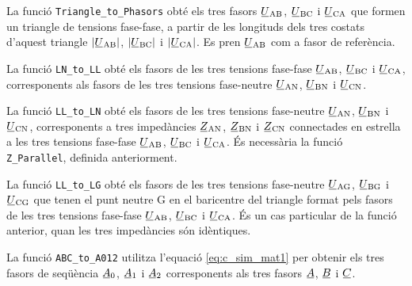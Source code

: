 La funció \texttt{Triangle\_to\_Phasors} obté els tres fasors $\cmplx{U}\ped{AB}$, $\cmplx{U}\ped{BC}$ i $\cmplx{U}\ped{CA}$ que formen un triangle de tensions fase-fase, a partir de les longituds dels tres costats d'aquest triangle $|\cmplx{U}\ped{AB}|$, $|\cmplx{U}\ped{BC}|$ i $|\cmplx{U}\ped{CA}|$. Es pren $\cmplx{U}\ped{AB}$ com a fasor de referència.




La funció \texttt{LN\_to\_LL} obté els fasors de les tres tensions fase-fase $\cmplx{U}\ped{AB}$, $\cmplx{U}\ped{BC}$ i $\cmplx{U}\ped{CA}$, corresponents als fasors de les tres tensions fase-neutre
$\cmplx{U}\ped{AN}$, $\cmplx{U}\ped{BN}$ i $\cmplx{U}\ped{CN}$.




La funció \texttt{LL\_to\_LN} obté els fasors de les tres tensions fase-neutre $\cmplx{U}\ped{AN}$, $\cmplx{U}\ped{BN}$ i $\cmplx{U}\ped{CN}$, corresponents a tres impedàncies $\cmplx{Z}\ped{AN}$, $\cmplx{Z}\ped{BN}$ i $\cmplx{Z}\ped{CN}$ connectades en estrella a  les tres tensions fase-fase
$\cmplx{U}\ped{AB}$, $\cmplx{U}\ped{BC}$ i $\cmplx{U}\ped{CA}$. És necessària la funció \texttt{Z\_Parallel}, definida anteriorment.




La funció \texttt{LL\_to\_LG} obté els fasors de les tres tensions fase-neutre $\cmplx{U}\ped{AG}$, $\cmplx{U}\ped{BG}$ i $\cmplx{U}\ped{CG}$ que tenen el punt neutre G en el baricentre del triangle format pels fasors de  les tres tensions fase-fase
$\cmplx{U}\ped{AB}$, $\cmplx{U}\ped{BC}$ i $\cmplx{U}\ped{CA}$. És un cas particular de la funció anterior, quan les tres impedàncies són idèntiques.




La funció \texttt{ABC\_to\_A012} utilitza l'equació \eqref{eq:c_sim_mat1} per obtenir els tres fasors de seqüència
$\cmplx{A}_0$, $\cmplx{A}_1$ i  $\cmplx{A}_2$ corresponents als tres fasors $\cmplx{A}$, $\cmplx{B}$ i $\cmplx{C}$.

